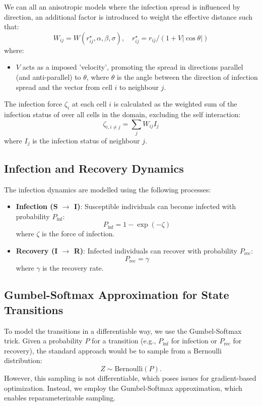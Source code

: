 \documentclass[12pt]{article}
\begin{document}
We can all an anisotropic models where the infection spread is influenced by direction, an additional factor is introduced to weight the effective distance such that:
\[
W_{ij}=W(r_{ij}^{\star},\alpha, \beta, \sigma), \quad r_{ij}^{\star}=r_{ij}/(1+V |\cos \theta|)
\]
where:
\begin{itemize}
    \item $V$ acts as a imposed 'velocity', promoting the spread in directions parallel (and anti-parallel) to $\theta$, where $\theta$ is the angle between the direction of infection spread and the vector from cell $i$ to neighbour $j$.
\end{itemize}

The infection force $\zeta_i$ at each cell $i$ is calculated as the weighted sum of the infection status of over all cells in the domain, excluding the self interaction:
\[
\zeta_{i, i\ne j} = \sum_j W_{ij} I_j
\]
where $I_j$ is the infection status of neighbour $j$.

\subsection{Infection and Recovery Dynamics}
The infection dynamics are modelled using the following processes:
\begin{itemize}
    \item \textbf{Infection (S $\to$ I)}: Susceptible individuals can become infected with probability $P_{\text{inf}}$:
    \[
    P_{\text{inf}} = 1 - \exp(-\zeta)
    \]
    where $\zeta$ is the force of infection.
    \item \textbf{Recovery (I $\to$ R)}: Infected individuals can recover with probability $P_{\text{rec}}$:
    \[
    P_{\text{rec}} = \gamma
    \]
    where $\gamma$ is the recovery rate.
\end{itemize}
\subsection{Gumbel-Softmax Approximation for State Transitions}

To model the transitions in a differentiable way, we use the Gumbel-Softmax trick. Given a probability \( P \) for a transition (e.g., \( P_{\text{inf}} \) for infection or \( P_{\text{rec}} \) for recovery), the standard approach would be to sample from a Bernoulli distribution:
\[
Z \sim \text{Bernoulli}(P).
\]
However, this sampling is not differentiable, which poses issues for gradient-based optimization. Instead, we employ the Gumbel-Softmax approximation, which enables reparameterizable sampling.
\end{document}
